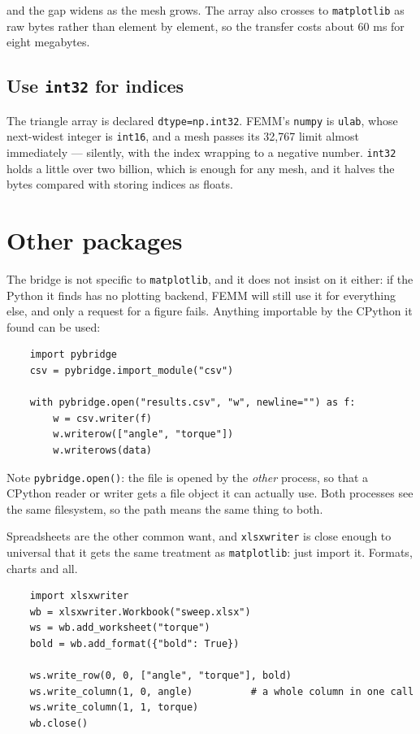 \noindent and the gap widens as the mesh grows.  The array also crosses to
{\tt matplotlib} as raw bytes rather than element by element, so the transfer
costs about 60 ms for eight megabytes.

\subsection*{Use {\tt int32} for indices}

The triangle array is declared {\tt dtype=np.int32}.  FEMM's {\tt numpy} is
{\tt ulab}, whose next-widest integer is {\tt int16}, and a mesh passes its
32,767 limit almost immediately --- silently, with the index wrapping to a
negative number.  {\tt int32} holds a little over two billion, which is enough
for any mesh, and it halves the bytes compared with storing indices as floats.

\section{Other packages}

The bridge is not specific to {\tt matplotlib}, and it does not insist on it
either: if the Python it finds has no plotting backend, FEMM will still use it
for everything else, and only a request for a figure fails.  Anything
importable by the CPython it found can be used:

\begin{verbatim}
    import pybridge
    csv = pybridge.import_module("csv")

    with pybridge.open("results.csv", "w", newline="") as f:
        w = csv.writer(f)
        w.writerow(["angle", "torque"])
        w.writerows(data)
\end{verbatim}

Note {\tt pybridge.open()}: the file is opened by the {\em other} process, so
that a CPython reader or writer gets a file object it can actually use.  Both
processes see the same filesystem, so the path means the same thing to both.

Spreadsheets are the other common want, and {\tt xlsxwriter} is close enough
to universal that it gets the same treatment as {\tt matplotlib}: just import
it.  Formats, charts and all.

\begin{verbatim}
    import xlsxwriter
    wb = xlsxwriter.Workbook("sweep.xlsx")
    ws = wb.add_worksheet("torque")
    bold = wb.add_format({"bold": True})

    ws.write_row(0, 0, ["angle", "torque"], bold)
    ws.write_column(1, 0, angle)          # a whole column in one call
    ws.write_column(1, 1, torque)
    wb.close()
\end{verbatim}

